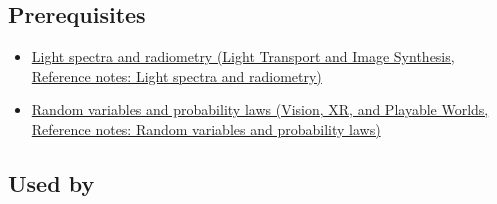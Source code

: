 \subsection{Prerequisites}\label{appendix-4815cd87ab8b-prerequisites}

\begin{itemize}
\tightlist
\item
  \href{../04-Light-Transport-and-Image-Synthesis/main.pdf\#nameddest=appendix-215c2570199b}{Light spectra and radiometry (Light Transport and Image Synthesis, Reference notes: Light spectra and radiometry)}
\item
  \href{../07-Vision-XR-and-Playable-Worlds/main.pdf\#nameddest=appendix-4d0203f7944f}{Random variables and probability laws (Vision, XR, and Playable Worlds, Reference notes: Random variables and probability laws)}
\end{itemize}

\subsection{Used by}\label{appendix-4815cd87ab8b-used-by}


